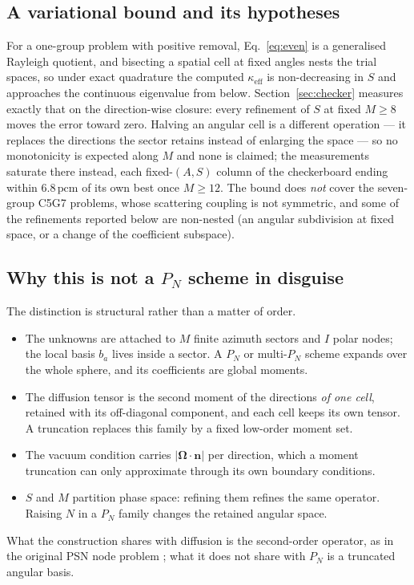 \documentclass[11pt,a4paper]{article}
\newcommand{\keff}{\kappa_{\mathrm{eff}}}
\newcommand{\pcm}{\,\mathrm{pcm}}
\begin{document}
\subsection{A variational bound and its hypotheses}
For a one-group problem with positive removal, Eq.~\eqref{eq:even} is a generalised
Rayleigh quotient, and bisecting a spatial cell at fixed angles nests the trial spaces,
so under exact quadrature the computed $\keff$ is non-decreasing in $S$ and approaches
the continuous eigenvalue from below. Section~\ref{sec:checker} measures exactly that
on the direction-wise closure: every refinement of $S$ at fixed $M\ge8$ moves the error
toward zero. Halving an angular cell is a different operation --- it replaces the
directions the sector retains instead of enlarging the space --- so no monotonicity is
expected along $M$ and none is claimed; the measurements saturate there instead, each
fixed-$(A,S)$ column of the checkerboard ending within $6.8\pcm$ of its own best once
$M{\ge}12$. The bound does \emph{not} cover the seven-group
C5G7 problems, whose scattering coupling is not symmetric, and some of the refinements
reported below are non-nested (an angular subdivision at fixed space, or a change of the
coefficient subspace).

\subsection{Why this is not a $P_N$ scheme in disguise}
The distinction is structural rather than a matter of order.
\begin{itemize}[leftmargin=1.6em,itemsep=1pt,topsep=2pt]
\item The unknowns are attached to $M$ finite azimuth sectors and $I$ polar nodes;
  the local basis $b_a$ lives inside a sector. A $P_N$ or multi-$P_N$ scheme
  \cite{ghazaie2019mpn,falabino2022mpn} expands over the whole sphere, and its
  coefficients are global moments.
\item The diffusion tensor is the second moment of the directions \emph{of one
  cell}, retained with its off-diagonal component, and each cell keeps its own
  tensor. A truncation replaces this family by a fixed low-order moment set.
\item The vacuum condition carries $|\boldsymbol{\Omega}\cdot\mathbf{n}|$ per
  direction, which a moment truncation can only approximate through its own
  boundary conditions.
\item $S$ and $M$ partition phase space: refining them refines the same operator.
  Raising $N$ in a $P_N$ family changes the retained angular space.
\end{itemize}
What the construction shares with diffusion is the second-order operator, as in the
original PSN node problem \cite{psn2027}; what it does not share with $P_N$ is a
truncated angular basis.
\end{document}
